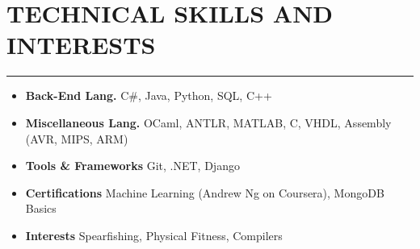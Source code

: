 \section*{TECHNICAL SKILLS AND INTERESTS}
		\hrule \relax
		\sectionheaderspace
		
		\begin{itemize}[noitemsep,nolistsep, label={}]
			\item \textbf{Back-End Lang.}                    \tabto*{5cm} C\#, Java, Python, SQL, C++
			\item \textbf{Miscellaneous Lang.}             \tabto*{5cm} OCaml, ANTLR, MATLAB, C, VHDL, Assembly (AVR, MIPS, ARM)
			\item \textbf{Tools \& Frameworks}  \tabto*{5cm} Git, .NET, Django
			\item \textbf{Certifications}			   \tabto*{5cm} Machine Learning (Andrew Ng on Coursera), MongoDB Basics
			\item \textbf{Interests}                     \tabto*{5cm} Spearfishing, Physical Fitness, Compilers
		\end{itemize}